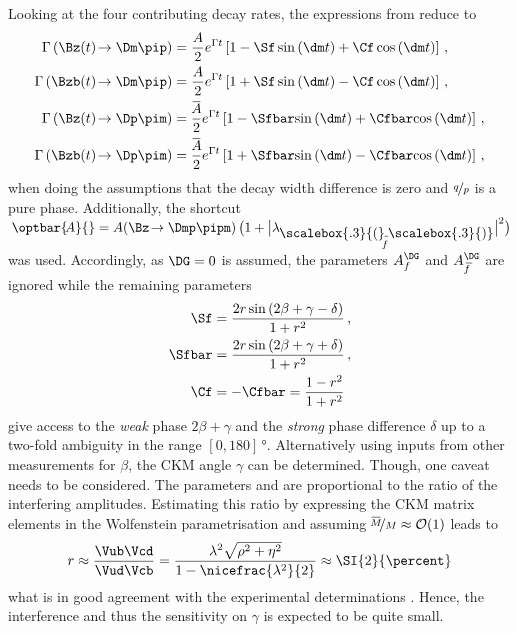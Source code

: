 Looking at the four contributing decay rates, the expressions from  reduce to
\begin{align}
\Gamma\left(\Bz(t)\!\to\Dm\pip\right)&= \frac{A}{2}e^{\Gamma t}\left[1-\Sf\sin\left(\dm t\right)+\Cf\cos\left(\dm t\right)\right]\label{eq:DecRateB2Dmpip}\,,\\
\Gamma\left(\Bzb(t)\!\to\Dm\pip\right)&= \frac{A}{2}e^{\Gamma t}\left[1+\Sf\sin\left(\dm t\right)-\Cf\cos\left(\dm t\right)\right]\label{eq:DecRateBb2Dmpip}\,,\\
\Gamma\left(\Bz(t)\!\to\Dp\pim\right)&= \frac{\overline{\kern -1.0pt A\kern -1.0pt}}{2}e^{\Gamma t}\left[1-\Sfbar\!\sin\left(\dm t\right)+\Cfbar\!\cos\left(\dm t\right)\right]\label{eq:DecRateB2Dppim}\,,\\
\Gamma\left(\Bzb(t)\!\to\Dp\pim\right)&= \frac{\overline{\kern -1.0pt A\kern -1.0pt}}{2}e^{\Gamma t}\left[1+\Sfbar\!\sin\left(\dm t\right)-\Cfbar\!\cos\left(\dm t\right)\right]\label{eq:DecRateBb2Dppim}\,,
\end{align}
when doing the assumptions that the decay width difference \DG is zero and $\nicefrac{q}{p}$ is a pure phase.
Additionally, the shortcut $\kern 0.18em\optbar{\kern -0.18em A}{}=A\!\left(\Bz\!\to\Dmp\pipm\right)\big(1+\big|\lambda_{\kern -0.05em\shortstack{{\scalebox{.3}{(}\rule[.1ex]{0.25em}{.15mm}\scalebox{.3}{)}}\\ [-0.7ex]\kern -0.2em\scriptsize$f$}}\big|^2\big)$ was used.
Accordingly, as $\DG=0$ is assumed, the parameters $A_f^{\DG}$ and $A_{\kern 1.5pt\overline{\kern -1.5pt f\kern 1.5pt}}^{\DG}$ are ignored while the remaining \CP parameters
\begin{align}
\Sf&=\frac{2r\sin\left(2\beta+\gamma-\delta\right)}{1+r^2} \label{eq:DefSf}\,,\\
\Sfbar&=\frac{2r\sin\left(2\beta+\gamma+\delta\right)}{1+r^2} \label{eq:DefSfbar}\,,\\
\Cf&=-\Cfbar=\frac{1-r^2}{1+r^2}
\end{align}
give access to the \emph{weak} phase $2\beta+\gamma$ and the \emph{strong} phase difference $\delta$ up to a two-fold ambiguity in the range $[0, 180]\,\si{\degree}$.
Alternatively using inputs from other measurements for $\beta$, the CKM angle $\gamma$ can be determined.
Though, one caveat needs to be considered.
The parameters \Sf and \Sfbar are proportional to the ratio of the interfering amplitudes.
Estimating this ratio by expressing the CKM matrix elements in the Wolfenstein parametrisation and assuming $\nicefrac{\overline{\kern -1.0pt M\kern -1.0pt}}{M}\approx\mathcal{O}\!\left(1\right)$ leads to
\begin{equation}
r\approx\frac{\Vub\Vcd}{\Vud\Vcb}=\frac{\lambda^2\sqrt{\rho^2+\eta^2}}{1-\nicefrac{\lambda^2}{2}}\approx\SI{2}{\percent} \label{eq:ratioDpi}
\end{equation}
what is in good agreement with the experimental determinations \cite{Das:2010be, Aubert:2008zi}.
Hence, the interference and thus the sensitivity on $\gamma$ is expected to be quite small.

